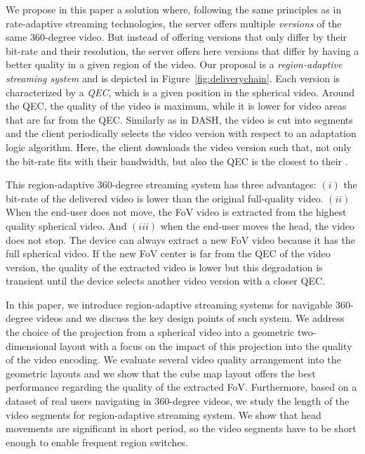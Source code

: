 We propose in this paper a solution where, following the same principles as in
rate-adaptive streaming technologies, the server offers multiple \emph{versions} of the same
360-degree video. But instead of offering versions that only differ by
their bit-rate and their resolution, the server offers here versions that differ by 
having a better quality in a given region of the video.
Our proposal is a \emph{region-adaptive streaming system} and is depicted in 
Figure~\ref{fig:deliverychain}.
Each version is characterized by a \emph{\ac{QEC}}, which is a given
position in the spherical video. Around the \ac{QEC}, the quality of the video is maximum,
while it is lower for video areas that are far from the \ac{QEC}. Similarly as 
in \ac{DASH}, the video is cut into segments and the client periodically selects
the video version with respect to an adaptation logic algorithm. Here, the client downloads 
the video version
such that, not only the bit-rate fits with their bandwidth, but also
the \ac{QEC} is the closest to their .



This region-adaptive 360-degree streaming system has three advantages:
$(i)$ the bit-rate of the delivered video is lower than the original full-quality video.
$(ii)$ When the end-user does not move, the \ac{FoV} video is extracted from the highest
quality spherical video.
And $(iii)$ when the end-user moves the head, the video does not stop. The device can
always extract
a new \ac{FoV} video because it has the full spherical video. If the 
new \ac{FoV} center is far from the
\ac{QEC} of the video version, the quality of the extracted video is lower but this
degradation is transient until the
device selects another video version with a closer \ac{QEC}.

In this paper, we introduce region-adaptive streaming systems for navigable 360-degree
videos and we discuss the key design points of such system. We address
the choice of the projection from a spherical video into a geometric two-dimensional layout
with a focus on the impact of this projection into the quality of the video encoding. We evaluate
several video quality arrangement into the geometric layouts and we show that the 
cube map layout offers the best performance regarding the quality of the extracted 
\ac{FoV}.
Furthermore, based on a dataset of
real users navigating in 360-degree videos, we study the length of the video segments
for region-adaptive streaming system. We show that head movements are significant
in short period, so the video segments have to be short enough to enable 
frequent region switches.

